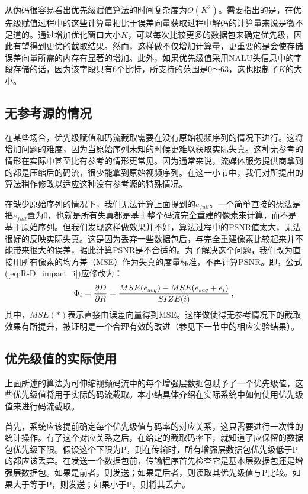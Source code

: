 从伪码很容易看出优先级赋值算法的时间复杂度为$O(K^2)$。需要指出的是，在优先级赋值过程中的这些计算量相比于误差向量获取过程中解码的计算量来说是微不足道的。通过增加优化窗口大小$K$，可以每次比较更多的数据包来确定优先级，因此有望得到更优的截取结果。然而，这样做不仅增加计算量，更重要的是会使存储误差向量所需的内存有显著的增加。此外，如果优先级值采用NALU头信息中的字段存储的话，因为该字段只有6个比特，所支持的范围是0～63，这也限制了$K$的大小。

\subsection{无参考源的情况}
\label{subsec:noref}

在某些场合，优先级赋值和码流截取需要在没有原始视频序列的情况下进行。这将增加问题的难度，因为当原始序列未知的时候更难以获取实际失真。这种无参考的情形在实际中甚至比有参考的情形更常见。因为通常来说，流媒体服务提供商拿到的都是压缩后的码流，很少能拿到原始视频序列。在这一小节中，我们对所提出的算法稍作修改以适应这种没有参考源的特殊情况。

在缺少原始序列的情况下，我们无法计算上面提到的$e_{full}$。一个简单直接的想法是把$e_{full}$置为0，也就是所有失真都是基于整个码流完全重建的像素来计算，而不是基于原始序列。但我们发现这样做效果并不好，算法过程中的PSNR值太大，无法很好的反映实际失真。这是因为丢弃一些数据包后，与完全重建像素比较起来并不能带来很大的误差，据此计算PSNR是不合适的。为了解决这个问题，我们改为直接用所有像素的均方差（MSE）作为失真的度量标准，不再计算PSNR。即，公式(\ref{eq:R-D_impact_i})应修改为：
\vspace{10pt}
\begin{equation}
\vspace{10pt}
\label{eq:R-D_impact_i_noref}
\Phi_i = \dfrac{\partial D}{\partial R} = \dfrac{MSE(e_{seq}) - MSE(e_{seq} + e_i)}{SIZE(i)} \: ,
\end{equation}
其中，$MSE(*)$表示直接由误差向量得到MSE。这样做使得无参考情况下的截取效果有所提升，被证明是一个合理有效的改进（参见下一节中的相应实验结果）。

\subsection{优先级值的实际使用}

上面所述的算法为可伸缩视频码流中的每个增强层数据包赋予了一个优先级值，这些优先级值将用于实际的码流截取。本小结具体介绍在实际系统中如何使用优先级值来进行码流截取。

首先，系统应该提前确定每个优先级值与码率的对应关系，这只需要进行一次性的统计操作。有了这个对应关系之后，在给定的截取码率下，就知道了应保留的数据包优先级下限。假设这个下限为P，则在传输时，所有增强层数据包优先级低于P的都应该丢弃。在发送一个数据包前，传输程序首先检查它是基本层数据包还是增强层数据包。如果是前者，则发送；如果是后者，则读取其优先级值与P比较。如果大于等于P，则发送；如果小于P，则将其丢弃。


